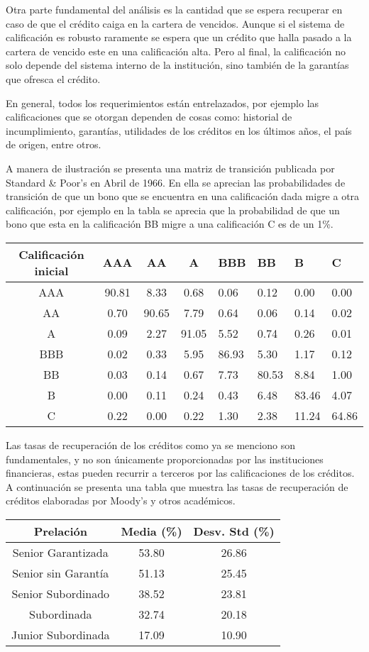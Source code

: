 \documentclass[
  12pt,
]{krantz}
\theoremstyle{definition}
\theoremstyle{definition}
\theoremstyle{definition}
\theoremstyle{remark}
\begin{document}
Otra parte fundamental del análisis es la cantidad que se espera recuperar en caso de que el crédito caiga en la cartera de vencidos. Aunque si el sistema de calificación es robusto raramente se espera que un crédito que halla pasado a la cartera de vencido este en una calificación alta. Pero al final, la calificación no solo depende del sistema interno de la institución, sino también de la garantías que ofresca el crédito.

En general, todos los requerimientos están entrelazados, por ejemplo las calificaciones que se otorgan dependen de cosas como: historial de incumplimiento, garantías, utilidades de los créditos en los últimos años, el país de origen, entre otros.

A manera de ilustración se presenta una matriz de transición publicada por Standard \& Poor's en Abril de 1966. En ella se aprecian las probabilidades de transición de que un bono que se encuentra en una calificación dada migre a otra calificación, por ejemplo en la tabla se aprecia que la probabilidad de que un bono que esta en la calificación BB migre a una calificación C es de un 1\%.

\begin{longtable}[]{@{}ccccllll@{}}
\toprule
Calificación inicial & AAA & AA & A & BBB & BB & B & C\tabularnewline
\midrule
\endhead
AAA & 90.81 & 8.33 & 0.68 & 0.06 & 0.12 & 0.00 & 0.00\tabularnewline
AA & 0.70 & 90.65 & 7.79 & 0.64 & 0.06 & 0.14 & 0.02\tabularnewline
A & 0.09 & 2.27 & 91.05 & 5.52 & 0.74 & 0.26 & 0.01\tabularnewline
BBB & 0.02 & 0.33 & 5.95 & 86.93 & 5.30 & 1.17 & 0.12\tabularnewline
BB & 0.03 & 0.14 & 0.67 & 7.73 & 80.53 & 8.84 & 1.00\tabularnewline
B & 0.00 & 0.11 & 0.24 & 0.43 & 6.48 & 83.46 & 4.07\tabularnewline
C & 0.22 & 0.00 & 0.22 & 1.30 & 2.38 & 11.24 & 64.86\tabularnewline
\bottomrule
\end{longtable}

Las tasas de recuperación de los créditos como ya se menciono son fundamentales, y no son únicamente proporcionadas por las instituciones financieras, estas pueden recurrir a terceros por las calificaciones de los créditos. A continuación se presenta una tabla que muestra las tasas de recuperación de créditos elaboradas por Moody's y otros académicos.

\begin{longtable}[]{@{}ccc@{}}
\toprule
Prelación & Media (\%) & Desv. Std (\%)\tabularnewline
\midrule
\endhead
Senior Garantizada & 53.80 & 26.86\tabularnewline
Senior sin Garantía & 51.13 & 25.45\tabularnewline
Senior Subordinado & 38.52 & 23.81\tabularnewline
Subordinada & 32.74 & 20.18\tabularnewline
Junior Subordinada & 17.09 & 10.90\tabularnewline
\bottomrule
\end{longtable}
\end{document}
